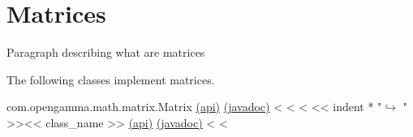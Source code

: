 \section{Matrices}

Paragraph describing what are matrices

The following classes implement matrices.

\begin{fullwidth}

com.opengamma.math.matrix.Matrix \href{http://docs-static.hq.opengamma.com/0.7.0/analytics/api/com.opengamma.math.matrix.Matrix.html#class-com.opengamma.math.matrix.Matrix}{(api)} \href{http://docs-static.hq.opengamma.com/0.7.0/analytics/javadoc/com/opengamma/math/matrix/Matrix}{(javadoc)}
<%
<%
<%
<< indent * "$\hookrightarrow$ " >><< class_name >> \href{http://docs-static.hq.opengamma.com/0.7.0/analytics/api/<< package_name >>.html#class-<<class_name>>}{(api)} \href{http://docs-static.hq.opengamma.com/0.7.0/java/javadocs/<< class_name.replace(".","/") >>.html}{(javadoc)}
<%
<%

\end{fullwidth}

